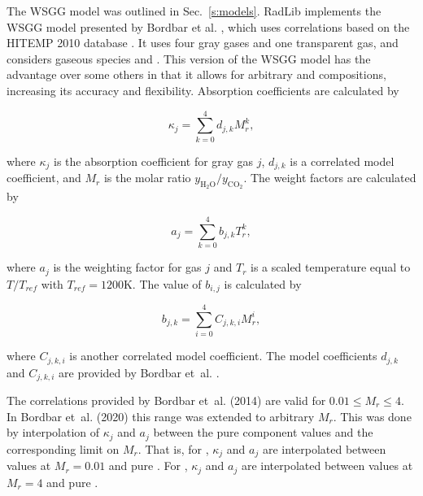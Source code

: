 \documentclass[preprint,12pt, a4paper]{elsarticle}
\begin{document}
The WSGG model was outlined in Sec.~\ref{s:models}.
RadLib implements the WSGG model presented by Bordbar et al. \citep{Bordbar_2014,Bordbar_2020}, which uses correlations based on the HITEMP 2010 database \cite{Rothman_2010}. It uses four gray gases and one transparent gas, and considers gaseous species  and . This version of the WSGG model has the advantage over some others in that it allows for arbitrary  and  compositions, increasing its accuracy and flexibility. Absorption coefficients are calculated by 
%
\begin{linenomath}
\begin{equation}
    \kappa_j=\sum_{k=0}^{4}d_{j,k}M_r^k,
\end{equation}
\end{linenomath}
%
where $\kappa_j$ is the absorption coefficient for gray gas $j$, $d_{j,k}$ is a correlated model coefficient, and $M_r$ is the molar ratio $y_{\mathrm{H_2O}}/y_{\mathrm{CO_2}}$. The weight factors are calculated by 
%
\begin{linenomath}
\begin{equation}
    a_j=\sum_{k=0}^{4}b_{j,k}T_r^k,
\end{equation}
\end{linenomath}
%
where $a_j$ is the weighting factor for gas $j$ and $T_r$ is a scaled temperature equal to $T/T_{ref}$ with $T_{ref}=1200$K. The value of $b_{i,j}$ is calculated by 
%
\begin{linenomath}
\begin{equation}
 b_{j,k}=\sum_{i=0}^{4}C_{j,k,i}M_r^i,
\end{equation}
\end{linenomath}
%
where $C_{j,k,i}$ is another correlated model coefficient. The model coefficients $d_{j,k}$ and $C_{j,k,i}$ are provided by Bordbar et~al. \citep{Bordbar_2014,Bordbar_2020}. 

The correlations provided by Bordbar et~al. (2014) \cite{Bordbar_2014} are valid for $0.01\le M_r\le4$. In Bordbar et~al. (2020) \cite{Bordbar_2020} this range was extended to arbitrary $M_r$. This was done by interpolation of $\kappa_j$ and $a_j$ between the pure component values and the corresponding limit on $M_r$. That is, for , $\kappa_j$ and $a_j$ are interpolated between values at $M_r=0.01$ and pure . For , $\kappa_j$ and $a_j$ are interpolated between values at $M_r=4$ and pure .

\end{document}

